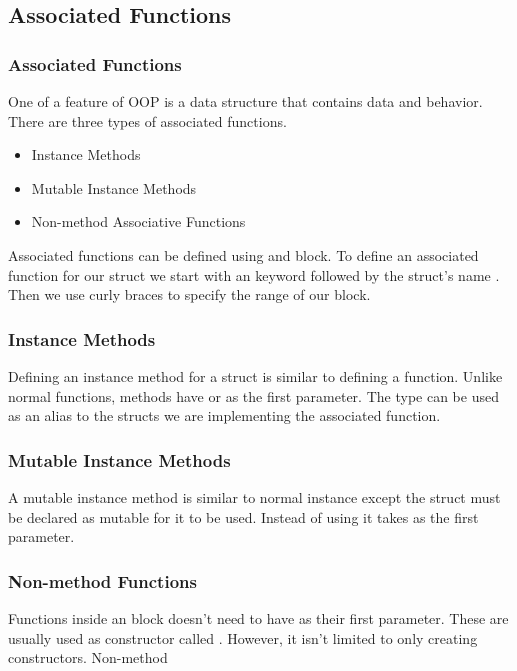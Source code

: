 \documentclass{beamer}
\begin{document}
\subsection{Associated Functions}
\begin{frame}
  \frametitle{Associated Functions}
  One of a feature of OOP is a data structure that contains data and behavior. There are three types of associated functions.
  \begin{itemize}
    \item Instance Methods
    \item Mutable Instance Methods
    \item Non-method Associative Functions
  \end{itemize}
  Associated functions can be defined using and  block. To define an associated function for our  struct we start with an  keyword followed by the struct's name . Then we use curly braces to specify the range of our block.
\end{frame}

\begin{frame}
  \frametitle{Instance Methods}
  Defining an instance method for a struct is similar to defining a function. Unlike normal functions, methods have  or  as the first parameter. The  type can be used as an alias to the structs we are implementing the associated function.
  
\end{frame}

\begin{frame}
  \frametitle{Mutable Instance Methods}
  A mutable instance method is similar to normal instance except the struct must be declared as mutable for it to be used. Instead of using  it takes  as the first parameter.
  
\end{frame}

\begin{frame}
  \frametitle{Non-method Functions}
  Functions inside an  block doesn't need to have  as their first parameter. These are usually used as constructor called . However, it isn't limited to only creating constructors. Non-method
  
\end{frame}
\end{document}
